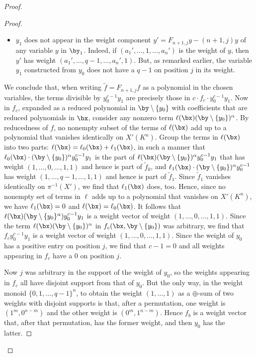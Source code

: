 \documentclass{amsart}
\newcommand{\ab}{c} %
\begin{document}
\begin{proof}
\begin{proof}
\begin{itemize}
\item $y_1$ does not appear in the weight component $y'=F_{n+1,j}
y - (n+1,j) y$ of any variable $y$ in $\by_1$. Indeed, if
$(a_1',\ldots,1,\ldots,a_n')$ is the weight of $y$, then $y'$ has
weight $(a_1',\ldots,q-1,\ldots,a_n',1)$. But, as remarked earlier, the
variable $y_1$ constructed from $y_0$ does not have a $q-1$ on position
$j$ in its weight.
\end{itemize}

We conclude that, when writing $\tilde{f}=F_{n+1,j}f$ as a polynomial
in the chosen variables, the terms divisible by $y_0^{{\ab}-1} y_1$ are
precisely those in ${\ab} \cdot f_{\ab} \cdot y_0^{{\ab}-1} y_1$.  Now in $f_{\ab}$,
expanded as a reduced polynomial in $\by \setminus \{y_0\}$ with coefficients
that are reduced polynomials in $\bx$, consider any nonzero term $\ell(\bx)
(\by \setminus \{y_0\})^\alpha$. By reducedness of $f$, no nonempty
subset of the terms of $\ell(\bx)$ add up to a polynomial that vanishes
identically on $X'(K^n)$.  Group the terms in $\ell(\bx)$ into two
parts: $\ell(\bx)=\ell_0(\bx) + \ell_1(\bx)$, in such a manner that
$\ell_0(\bx)\cdot (\by \setminus \{y_0\})^\alpha y_0^{{\ab}-1} y_1$ is the
part of $\ell(\bx) (\by\setminus \{y_0\})^{\alpha} y_0^{{\ab}-1} y_1$ that has
weight $(1,\ldots,0,\ldots,1,1)$ and hence is part of $\tilde{f}_0$, and
$\ell_1(\bx)\cdot (\by\setminus \{y_0\})^{\alpha} y_0^{{\ab}-1}$ has weight
$(1,\ldots,q-1,\ldots,1,1)$ and hence is part of $\tilde{f}_1$. Since
$\tilde{f}_1$ vanishes identically on $\pi^{-1}(X')$, we find that
$\ell_1(\bx)$ does, too. Hence, since no nonempty set of
terms in $\ell$ adds up to a polynomial that vanishes on
$X'(K^n)$, we have  $\ell_1(\bx)=0$ and
$\ell(\bx)=\ell_0(\bx)$. It follows that $\ell(\bx)(\by
\setminus \{y_0\}^\alpha) y_0^{{\ab}-1} y_1$
is a weight vector of weight $(1,\ldots,0,\ldots,1,1)$.
Since the term $\ell(\bx)(\by \setminus \{y_0\})^\alpha$ in
$f_{\ab}(\bx,\by \setminus \{y_0\})$ was arbitrary, we find that
$f_{\ab} y_0^{{\ab}-1} y_1$ is a weight vector of weight
$(1,\ldots,0,\ldots,1,1)$. Since the weight of $y_0$ has a
positive entry on position $j$, we find that ${\ab}-1=0$ and all
weights appearing in $f_{\ab}$ have a $0$ on position $j$. 

Now $j$ was arbitrary in the support of the weight of $y_0$, so the
weights appearing in $f_{\ab}$ all have disjoint support from that of
$y_0$. But the only way, in the weight monoid
$\{0,1,\ldots,q-1\}^n$,
to obtain the weight $(1,\ldots,1)$ as a $\oplus$-sum of two weights
with disjoint supports is that, after a permutation, one weight is
$(1^m,0^{n-m})$ and the other weight is $(0^m,1^{n-m})$.  Hence $f_b$
is a weight vector that, after that permutation, has the former weight,
and then $y_0$ has the latter.
\end{proof}


\end{proof}
\end{document}
